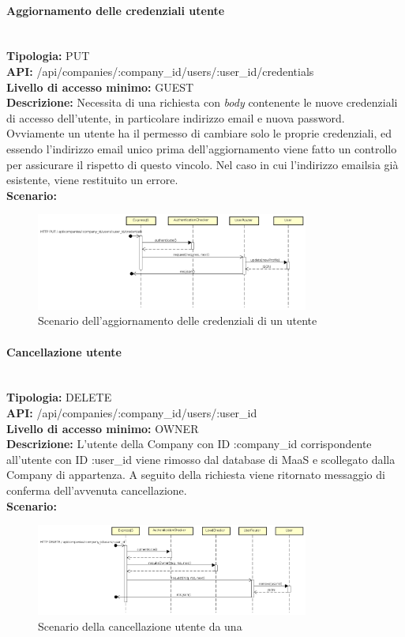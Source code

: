 \paragraph{Aggiornamento delle credenziali utente}\mbox{}\\
\textbf{Tipologia:} PUT \\
\textbf{API:} /api/companies/:company\_id/users/:user\_id/credentials \\
\textbf{Livello di accesso minimo:} GUEST \\
\textbf{Descrizione:} Necessita di una richiesta con \textit{body} contenente le nuove credenziali di accesso dell'utente, in particolare indirizzo email e nuova password. Ovviamente un utente ha il permesso di cambiare solo le proprie credenziali, ed essendo l'indirizzo email unico prima dell'aggiornamento viene fatto un controllo per assicurare il rispetto di questo vincolo. Nel caso in cui l'indirizzo emailsia già esistente, viene restituito un errore. \\
\textbf{Scenario:} 
\begin{figure}[H]
\centering
\includegraphics[width=0.8\textwidth]{res/sections/backend/sequence/(PUT)credenzialiUtente.png}
\caption{Scenario dell'aggiornamento delle credenziali di un utente}
\end{figure}

\newpage
\paragraph{Cancellazione utente}\mbox{}\\
\textbf{Tipologia:} DELETE \\
\textbf{API:} /api/companies/:company\_id/users/:user\_id \\
\textbf{Livello di accesso minimo:} OWNER \\
\textbf{Descrizione:} L'utente della Company con ID :company\_id corrispondente all'utente con ID :user\_id viene rimosso dal database di MaaS e scollegato dalla Company di appartenza. A seguito della richiesta viene ritornato messaggio di conferma dell'avvenuta cancellazione. \\
\textbf{Scenario:} 
\begin{figure}[H]
\centering
\includegraphics[width=0.8\textwidth]{res/sections/backend/sequence/(DELETE)user.png}
\caption{Scenario della cancellazione utente da una }
\end{figure}

